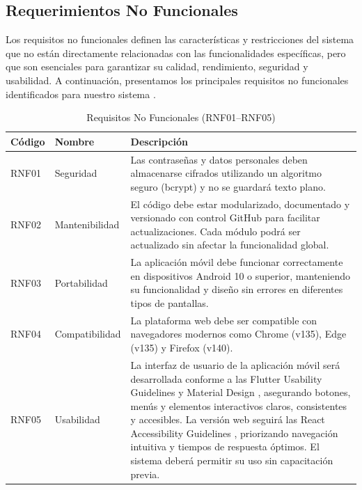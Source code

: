 
\subsection{Requerimientos No Funcionales}
Los requisitos no funcionales definen las características y restricciones del sistema que no están directamente relacionadas con las funcionalidades específicas,
pero que son esenciales para garantizar su calidad, rendimiento, seguridad y usabilidad. A continuación, presentamos los principales requisitos no funcionales
identificados para nuestro sistema \cite{RequisitosNoFuncionales}.

\begin{table}[H]
\centering
\renewcommand{\arraystretch}{1.2}
\begin{tabularx}{\textwidth}{l l X}
\toprule
\textbf{Código} & \textbf{Nombre} & \textbf{Descripción} \\
\midrule

RNF01 & Seguridad &
Las contraseñas y datos personales deben almacenarse cifrados utilizando un algoritmo seguro (bcrypt) y no se guardará texto plano. \\

RNF02 & Mantenibilidad &
El código debe estar modularizado, documentado y versionado con control GitHub para facilitar actualizaciones. Cada módulo podrá ser actualizado sin afectar la funcionalidad global. \\

RNF03 & Portabilidad &
La aplicación móvil debe funcionar correctamente en dispositivos Android 10 o superior, manteniendo su funcionalidad y diseño sin errores en diferentes tipos de pantallas. \\

RNF04 & Compatibilidad &
La plataforma web debe ser compatible con navegadores modernos como Chrome (v135), Edge (v135) y Firefox (v140). \\

RNF05 & Usabilidad &
La interfaz de usuario de la aplicación móvil será desarrollada conforme a las Flutter Usability Guidelines y Material Design \cite{flutter2024}, asegurando botones, menús y elementos interactivos claros, consistentes y accesibles. La versión web seguirá las React Accessibility Guidelines \cite{react2024} \cite{infinum2024}, priorizando navegación intuitiva y tiempos de respuesta óptimos. El sistema deberá permitir su uso sin capacitación previa. \\

\bottomrule
\end{tabularx}
\caption{Requisitos No Funcionales (RNF01–RNF05)}
\end{table}
